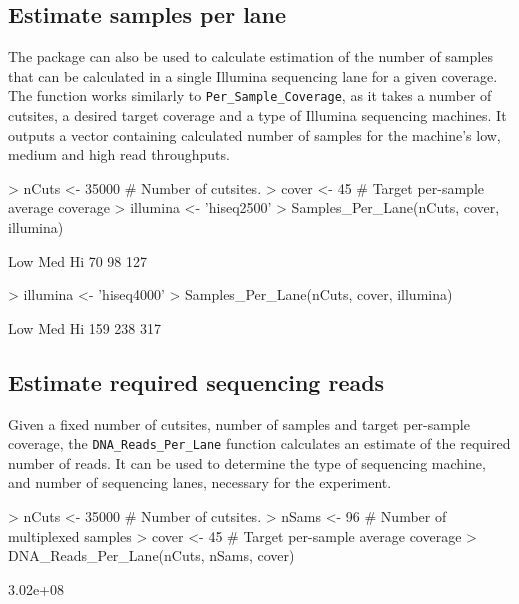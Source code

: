 \documentclass{article}
\begin{document}
\subsection{Estimate samples per lane}
The package can also be used to calculate estimation of the number of samples that can be calculated in a single Illumina sequencing lane for a given coverage. The function works similarly to \texttt{Per\_Sample\_Coverage}, as it takes a number of cutsites, a desired target coverage and a type of Illumina sequencing machines. It outputs a vector containing calculated number of samples for the machine's low, medium and high read throughputs.
\begin{Schunk}
\begin{Sinput}
> nCuts <- 35000     # Number of cutsites.   
> cover <- 45        # Target per-sample average coverage
> illumina <- 'hiseq2500'
> Samples_Per_Lane(nCuts, cover, illumina)
\end{Sinput}
\begin{Soutput}
Low Med  Hi 
 70  98 127 
\end{Soutput}
\begin{Sinput}
> illumina <- 'hiseq4000'
> Samples_Per_Lane(nCuts, cover, illumina)
\end{Sinput}
\begin{Soutput}
Low Med  Hi 
159 238 317 
\end{Soutput}
\end{Schunk}

\subsection{Estimate required sequencing reads}
Given a fixed number of cutsites, number of samples and target per-sample coverage, the \texttt{DNA\_Reads\_Per\_Lane} function calculates an estimate of the required number of reads. It can be used to determine the type of sequencing machine, and number of sequencing lanes, necessary for the experiment.
\begin{Schunk}
\begin{Sinput}
> nCuts <- 35000     # Number of cutsites.
> nSams <- 96        # Number of multiplexed samples 
> cover <- 45        # Target per-sample average coverage
> DNA_Reads_Per_Lane(nCuts, nSams, cover)
\end{Sinput}
\begin{Soutput}
[1] 3.02e+08
\end{Soutput}
\end{Schunk}
\end{document}
